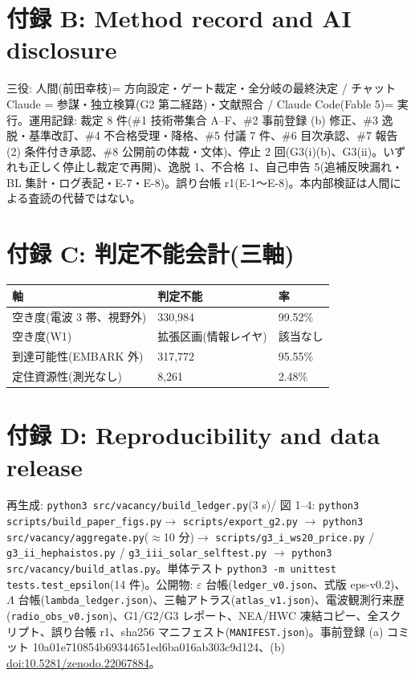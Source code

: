 \documentclass[11pt]{article}
\begin{document}
\section*{付録 B: Method record and AI disclosure}
\noindent 三役: 人間(前田幸枝)= 方向設定・ゲート裁定・全分岐の最終決定 / チャット Claude = 参謀・独立検算(G2 第二経路)・文献照合 / Claude Code(Fable 5)= 実行。運用記録: 裁定 8 件(\#1 技術帯集合 A–F、\#2 事前登録 (b) 修正、\#3 逸脱・基準改訂、\#4 不合格受理・降格、\#5 付議 7 件、\#6 目次承認、\#7 報告 (2) 条件付き承認、\#8 公開前の体裁・文体)、停止 2 回(G3(i)(b)、G3(ii)。いずれも正しく停止し裁定で再開)、逸脱 1、不合格 1、自己申告 5(追補反映漏れ・BL 集計・ログ表記・E-7・E-8)。誤り台帳 r1(E-1〜E-8)。本内部検証は人間による査読の代替ではない。\par\smallskip

\section*{付録 C: 判定不能会計(三軸)}
{\footnotesize\setlength{\tabcolsep}{3.5pt}\begin{center}\begin{tabular}{lll}
軸 & 判定不能 & 率 \\
\hline
空き度(電波 3 帯、視野外) & 330,984 & 99.52\% \\
空き度(W1) & 拡張区画(情報レイヤ) & 該当なし \\
到達可能性(EMBARK 外) & 317,772 & 95.55\% \\
定住資源性(測光なし) & 8,261 & 2.48\% \\
\end{tabular}\end{center}}

\section*{付録 D: Reproducibility and data release}
\noindent 再生成: \texttt{python3 src/vacancy/build\_ledger.py}(3 s)/ 図 1–4: \texttt{python3 scripts/build\_paper\_figs.py}\(\rightarrow\) \texttt{scripts/export\_g2.py} \(\rightarrow\) \texttt{python3 src/vacancy/aggregate.py}(\(\approx\)10 分)\(\rightarrow\) \texttt{scripts/g3\_i\_ws20\_price.py} / \texttt{g3\_ii\_hephaistos.py} / \texttt{g3\_iii\_solar\_selftest.py} \(\rightarrow\) \texttt{python3 src/vacancy/build\_atlas.py}。単体テスト \texttt{python3 -m unittest tests.test\_epsilon}(14 件)。公開物: \(\varepsilon\) 台帳(\texttt{ledger\_v0.json}、式版 eps-v0.2)、\(\Lambda\) 台帳(\texttt{lambda\_ledger.json})、三軸アトラス(\texttt{atlas\_v1.json})、電波観測行来歴(\texttt{radio\_obs\_v0.json})、G1/G2/G3 レポート、NEA/HWC 凍結コピー、全スクリプト、誤り台帳 r1、sha256 マニフェスト(\texttt{MANIFEST.json})。事前登録 (a) コミット 10a01e710854b69344651ed6ba016ab303c9d124、(b) \url{doi:10.5281/zenodo.22067884}。\par\smallskip
\end{document}

